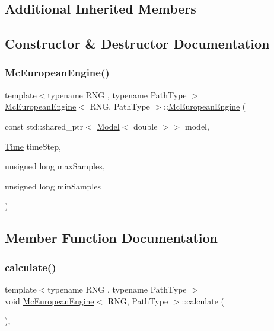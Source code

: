 \subsection*{Additional Inherited Members}


\subsection{Constructor \& Destructor Documentation}
\hypertarget{class_mc_european_engine_aa571d66762d49d9bdb29b591a74e1ee0}{}\label{class_mc_european_engine_aa571d66762d49d9bdb29b591a74e1ee0} 
\subsubsection{\texorpdfstring{Mc\+European\+Engine()}{McEuropeanEngine()}}
{\footnotesize\ttfamily template$<$typename R\+NG , typename Path\+Type $>$ \\
\hyperlink{class_mc_european_engine}{Mc\+European\+Engine}$<$ R\+NG, Path\+Type $>$\+::\hyperlink{class_mc_european_engine}{Mc\+European\+Engine} (\begin{DoxyParamCaption}\item[{const std\+::shared\+\_\+ptr$<$ \hyperlink{class_model}{Model}$<$ double $>$$>$}]{model,  }\item[{\hyperlink{_name_def_8h_ac2d3e0ba793497bcca555c7c2cf64ff3}{Time}}]{time\+Step,  }\item[{unsigned long}]{max\+Samples,  }\item[{unsigned long}]{min\+Samples }\end{DoxyParamCaption})}



\subsection{Member Function Documentation}
\hypertarget{class_mc_european_engine_ade20e53724dc0a0b103b211ee61a7c67}{}\label{class_mc_european_engine_ade20e53724dc0a0b103b211ee61a7c67} 
\subsubsection{\texorpdfstring{calculate()}{calculate()}}
{\footnotesize\ttfamily template$<$typename R\+NG , typename Path\+Type $>$ \\
void \hyperlink{class_mc_european_engine}{Mc\+European\+Engine}$<$ R\+NG, Path\+Type $>$\+::calculate (\begin{DoxyParamCaption}{ }\end{DoxyParamCaption})\hspace{0.3cm}{\ttfamily [override]}, {\ttfamily [virtual]}}



